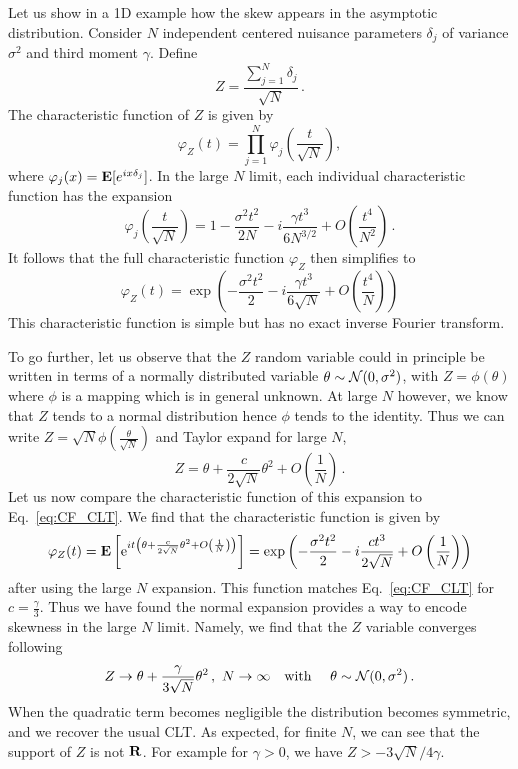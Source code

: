 \documentclass[11pt]{article}
\newcommand{\be}{\begin{equation}}
\newcommand{\ee}{\end{equation}}
\begin{document}
Let us show in a 1D example how the skew appears  in the asymptotic distribution. Consider $N$ independent centered nuisance parameters $\delta_j$ of variance $\sigma^2$ and third moment $\gamma$. Define \be Z=\frac{\sum_{j=1}^N \delta_j}{\sqrt{N}}\,.
\ee
The characteristic function of $Z$ is given by
\be
\varphi_Z(t)=\prod_{j=1}^N\varphi_{j}\left(\frac{t}{\sqrt{N}}\right),
\ee
where $\varphi_{j}(x) = {\bf E}[e^{ix\delta_{j}}]$.
 In the large $N$ limit, each individual characteristic function has the expansion
\be
\varphi_{j}\left(\frac{t}{\sqrt{N}}\right)= 1-\frac{\sigma^2 t^2}{2N}-i \frac{\gamma t^3}{6 N^{3/2}} +O\left(\frac{t^4}{N^2}\right)\,.
\ee
It follows that the full characteristic function $\varphi_Z$ then simplifies to
\be
\varphi_Z(t)=\exp\left(-\frac{\sigma^2 t^2}{2}-i \frac{\gamma t^3}{6 \sqrt{N}} +O\left(\frac{t^4}{N}\right)\right) \label{eq:CF_CLT}
 \ee
 This characteristic function is simple but has no exact inverse Fourier transform.


To go further, let us observe that the $Z$ random variable could in principle be written in terms of a normally distributed variable $\theta\sim {\cal N}(0,\sigma^2)$,
 with $Z=\phi(\theta)$ where $\phi$ is a mapping which is in general unknown.  At large $N$ however, we know that $Z$ tends to a normal distribution hence $\phi$ tends to the identity. Thus we can write $Z=\sqrt{N}\phi\left(\frac{\theta}{\sqrt{N}}\right)$ and Taylor expand for large $N$,
\be
Z=\theta+\frac{c}{2\sqrt{N}}\theta^2+O\left(\frac{1}{N}\right)\,.
\ee
Let us now compare the characteristic function of  this expansion to Eq.~\eqref{eq:CF_CLT}.
We find that the characteristic function is given by
\be
\varphi_Z(t)={\bf E} \left[ \mathrm{e}^{it \left(\theta+\frac{c}{2\sqrt{N}}\theta^2+O\left(\frac{1}{N}\right)\right)} \right]
=\exp\left(-\frac{\sigma^2 t^2}{2}-i \frac{c t^3}{ 2 \sqrt{N}} +O\left(\frac{1}{N}\right)\right)
\label{eq:CF_exp}
\ee
after using the large $N$ expansion. This function matches Eq.~\eqref{eq:CF_CLT} for $c=\frac{\gamma}{3}$. Thus we have found the normal expansion provides a way to encode skewness in the large $N$ limit. Namely, we find that the $Z$ variable converges following
\be
Z\rightarrow \theta+\frac{\gamma}{3\sqrt{N}}\theta^2\,,\,\,N\rightarrow \infty  \quad \textrm{with } \quad \theta\sim{\cal N}(0,\sigma^2)\,.
\ee
When the quadratic term becomes negligible the distribution becomes symmetric, and we recover the usual CLT.
As expected, for finite $N$, we can see that  the support of $Z$ is not $\bf R$. For example for $\gamma>0$, we have
$Z > -3\sqrt{N}/4\gamma$.
\end{document}
